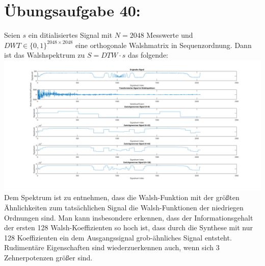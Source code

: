 

	\section*{Übungsaufgabe 40:}
		Seien $s$ ein ditialisiertes Signal mit $N= 2048$ Messwerte und $DWT \in\{0,1\}^{2048\times 2048}$ eine orthogonale Walshmatrix in Sequenzordnung. Dann ist das Walshspektrum zu $S = DTW\cdot s$ das folgende:\\
		\includegraphics[width = \textwidth]{A40.png}\\
		Dem Spektrum ist zu entnehmen, dass die Walsh-Funktion mit der größten Ähnlichkeiten zum tatsächlichen Signal die Walsh-Funktionen der niedriegen Ordnungen sind. Man kann insbesondere erkennen, dass der Informationsgehalt der ersten 128 Walsh-Koeffizienten so hoch ist, dass durch die Synthese mit nur 128 Koeffizienten ein dem Ausgangssignal grob-ähnliches Signal entsteht. Rudimentäre Eigenschaften sind wiederzuerkennen auch, wenn sich 3 Zehnerpotenzen größer sind.
	
